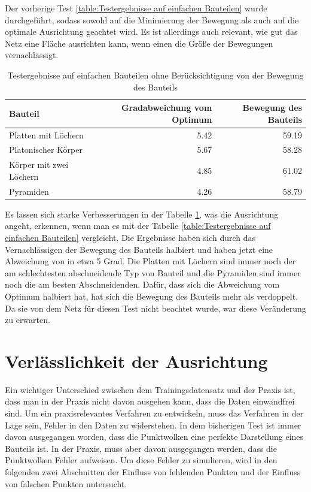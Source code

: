\smallskip

Der vorherige Test \ref{table:Testergebnisse auf einfachen Bauteilen} wurde durchgeführt, sodass sowohl auf die Minimierung der Bewegung als auch auf die optimale Ausrichtung geachtet wird. Es ist allerdings auch relevant, wie gut das Netz eine Fläche ausrichten kann, 
wenn einen die Größe der Bewegungen vernachlässigt.

\begin{table}[h]
\centering
\begin{tabular}{lrr}
\toprule
Bauteil & Gradabweichung vom Optimum & Bewegung des Bauteils\\
\midrule
Platten mit Löchern & 5.42 & 59.19 \\ \addlinespace
Platonischer Körper & 5.67 & 58.28 \\ \addlinespace
Körper mit zwei Löchern & 4.85 & 61.02\\
Pyramiden & 4.26 & 58.79\\
\bottomrule
\end{tabular}
\caption{Testergebnisse auf einfachen Bauteilen ohne Berücksichtigung von der Bewegung des Bauteils}
\label{table:Testergebnisse auf einfachen Bauteilen ohne Berücksichtigung von der Bewegung des Bauteils}
\end{table}

Es lassen sich starke Verbesserungen in der Tabelle \ref{table:Testergebnisse auf einfachen Bauteilen ohne Berücksichtigung von der Bewegung des Bauteils}, was die Ausrichtung angeht, erkennen, wenn man es mit der Tabelle \ref{table:Testergebnisse auf einfachen Bauteilen} vergleicht. 
Die Ergebnisse haben sich durch das Vernachlässigen der Bewegung des Bauteils halbiert und haben jetzt eine Abweichung von in etwa 5 Grad. Die Platten mit Löchern sind immer noch der am schlechtesten abschneidende Typ von Bauteil 
und die Pyramiden sind immer noch die am besten Abschneidenden. Dafür, dass sich die Abweichung vom Optimum halbiert hat, hat sich die Bewegung des Bauteils mehr als verdoppelt. Da sie von dem Netz für diesen Test nicht beachtet wurde, 
war diese Veränderung zu erwarten.

\section{Verlässlichkeit der Ausrichtung}
\label{Verlässlichkeit der Ausrichtung}

Ein wichtiger Unterschied zwischen dem Trainingsdatensatz und der Praxis ist, dass man in der Praxis nicht davon ausgehen kann, dass die Daten einwandfrei sind. Um ein praxisrelevantes Verfahren zu entwickeln, muss das Verfahren in der Lage sein, Fehler in den Daten zu widerstehen.
In dem bisherigen Test ist immer davon ausgegangen worden, dass die Punktwolken eine perfekte Darstellung eines Bauteils ist. In der Praxis, muss aber davon ausgegangen werden, dass die Punktwolken Fehler aufweisen. Um diese Fehler zu simulieren, 
wird in den folgenden zwei Abschnitten der Einfluss von fehlenden Punkten und der Einfluss von falschen Punkten untersucht. 

